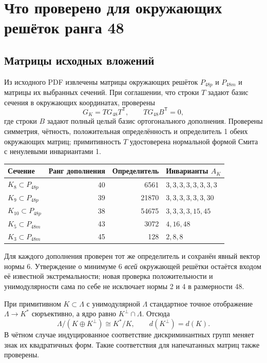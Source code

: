 \documentclass[11pt,a4paper]{article}
\theoremstyle{remark}\newtheorem{remark}[theorem]{Замечание}
\begin{document}
\section{Что проверено для окружающих решёток ранга 48}

\subsection{Матрицы исходных вложений}

Из исходного PDF извлечены матрицы окружающих решёток $P_{48p}$ и $P_{48m}$ и матрицы их выбранных сечений. При соглашении, что строки $T$ задают базис сечения в окружающих координатах, проверены
\[
G_K=T G_{48}T^{\mathsf T},\qquad
T G_{48}B^{\mathsf T}=0,
\]
где строки $B$ задают полный целый базис ортогонального дополнения. Проверены симметрия, чётность, положительная определённость и определитель 1 обеих окружающих матриц; примитивность $T$ удостоверена нормальной формой Смита с ненулевыми инвариантами 1.

\begin{center}
\begin{tabular}{lrrl}
\toprule
Сечение &Ранг дополнения&Определитель&Инварианты $A_K$\\\midrule
$K_8\subset P_{48p}$&40&6561&$3,3,3,3,3,3,3,3$\\
$K_9\subset P_{48p}$&39&21870&$3,3,3,3,3,3,30$\\
$K_{10}\subset P_{48p}$&38&54675&$3,3,3,3,15,45$\\
$K_5\subset P_{48m}$&43&3072&$4,16,48$\\
$K_3\subset P_{48m}$&45&128&$2,8,8$\\
\bottomrule
\end{tabular}
\end{center}

Для каждого дополнения проверен тот же определитель и сохранён явный вектор нормы 6. Утверждение о минимуме 6 \emph{всей} окружающей решётки остаётся входом её известной экстремальности; новая проверка положительности и унимодулярности сама по себе не исключает нормы 2 и 4 в размерности 48.

При примитивном $K\subset\Lambda$ с унимодулярной $\Lambda$ стандартное точное отображение $\Lambda\to K^*$ сюръективно, а ядро равно $K^\perp\cap\Lambda$. Отсюда
\[
\Lambda/(K\oplus K^\perp)\cong K^*/K,\qquad
d(K^\perp)=d(K).
\]
В чётном случае индуцированное соответствие дискриминантных групп меняет знак их квадратичных форм. Такие соответствия для напечатанных матриц также проверены.
\end{document}
